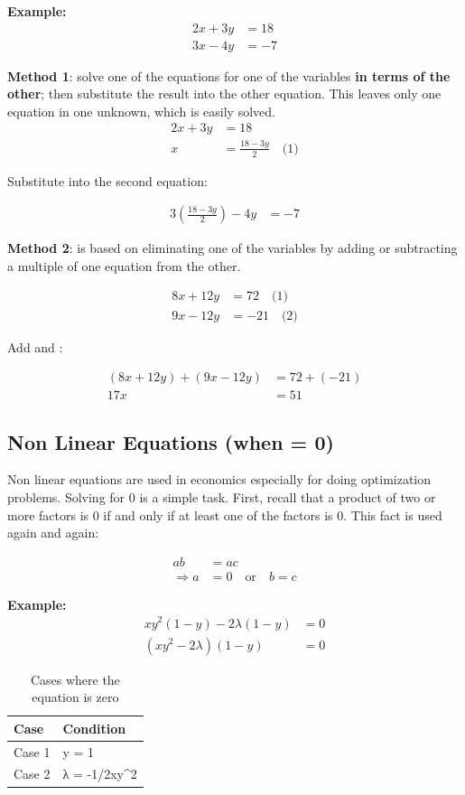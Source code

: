 \documentclass{article}
\begin{document}
\textbf{Example:}
\begin{align*}
2x + 3y &= 18 \\
3x - 4y &= -7
\end{align*}

\textbf{Method 1}: solve one of the equations for one of the variables \textbf{in terms of the other}; then substitute the result into the other equation. This leaves only one equation in one unknown, which is easily solved.
\begin{align*}
2x + 3y &= 18 \\
x &= \frac{18 - 3y}{2} \quad \text{(1)}
\end{align*}

Substitute  into the second equation:

\begin{align*}
3\left(\frac{18 - 3y}{2}\right) - 4y &= -7
\end{align*}

\textbf{Method 2}: is based on eliminating one of the variables by adding or subtracting a multiple of one equation from the other.

\begin{align*}
8x + 12y &= 72 \quad \text{(1)} \\
9x - 12y &= -21 \quad \text{(2)}
\end{align*}

Add  and :

\begin{align*}
(8x + 12y) + (9x - 12y) &= 72 + (-21) \\
17x &= 51
\end{align*}

\subsection{Non Linear Equations (when = 0)}

Non linear equations are used in economics especially for doing optimization problems. Solving for 0 is a simple task. First, recall that a product of two or more factors is 0 if and only if at least one of the factors is 0. This fact is used again and again:

\begin{align*}
ab &= ac \\
\Rightarrow a &= 0 \quad \text{or} \quad b = c
\end{align*}

\textbf{Example: }
\begin{equation*}
\begin{split}
    xy^2(1-y) -2 \lambda(1-y) &= 0 \\
    (xy^2 - 2 \lambda)(1-y) &= 0
\end{split}
\end{equation*}

\begin{table}[!h]

\caption{Cases where the equation is zero}
\centering
\begin{tabular}[t]{ll}
\toprule
Case & Condition\\
\midrule
Case 1 & y = 1\\
Case 2 & λ = -1/2xy\textasciicircum{}2\\
\bottomrule
\end{tabular}
\end{table}
\end{document}
